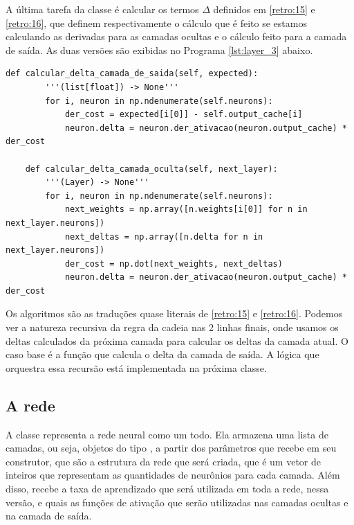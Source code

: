 A última tarefa da classe  é calcular os termos $\Delta$ definidos em \eqref{retro:15} e \eqref{retro:16}, que definem respectivamente o cálculo que é feito se estamos calculando as derivadas para as camadas ocultas e o cálculo feito para a camada de saída. As duas versões são exibidas no Programa \ref{lst:layer_3} abaixo.
\newline
\estiloR
\begin{lstlisting}[caption={Trecho da classe \eng{Layer}}, label={lst:layer_3}, escapeinside={\%}]
def calcular_delta_camada_de_saida(self, expected):
        '''(list[float]) -> None'''
        for i, neuron in np.ndenumerate(self.neurons):
            der_cost = expected[i[0]] - self.output_cache[i]
            neuron.delta = neuron.der_ativacao(neuron.output_cache) * der_cost

    def calcular_delta_camada_oculta(self, next_layer):
        '''(Layer) -> None'''
        for i, neuron in np.ndenumerate(self.neurons):
            next_weights = np.array([n.weights[i[0]] for n in next_layer.neurons])
            next_deltas = np.array([n.delta for n in next_layer.neurons])
            der_cost = np.dot(next_weights, next_deltas)
            neuron.delta = neuron.der_ativacao(neuron.output_cache) * der_cost
\end{lstlisting}


Os algoritmos são as traduções quase literais de \eqref{retro:15} e \eqref{retro:16}. Podemos ver a natureza recursiva da regra da cadeia nas 2 linhas finais, onde usamos os deltas calculados da próxima camada para calcular os deltas da camada atual. O caso base é a função que calcula o delta da camada de saída. A lógica que orquestra essa recursão está implementada na próxima classe.

\subsection{A rede}

A classe  representa a rede neural como um todo. Ela armazena uma lista de camadas, ou seja, objetos do tipo , a partir dos parâmetros que recebe em seu construtor, que são a estrutura da rede que será criada, que é um vetor de inteiros que representam as quantidades de neurônios para cada camada. Além disso, recebe a taxa de aprendizado que será utilizada em toda a rede, nessa versão, e quais as funções de ativação que serão utilizadas nas camadas ocultas e na camada de saída.

